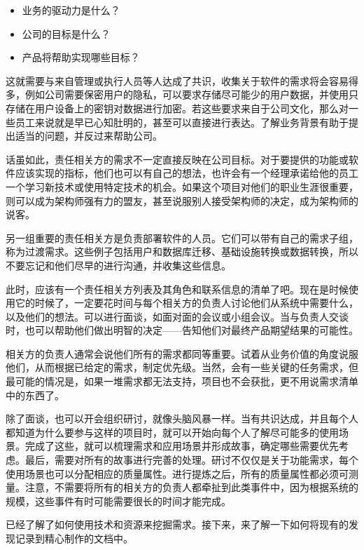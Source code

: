 \begin{itemize}
\item 
业务的驱动力是什么？

\item 
公司的目标是什么？

\item 
产品将帮助实现哪些目标？
\end{itemize}

这就需要与来自管理或执行人员等人达成了共识，收集关于软件的需求将会容易得多，例如公司需要保密用户的隐私，可以要求存储尽可能少的用户数据，并使用只存储在用户设备上的密钥对数据进行加密。若这些要求来自于公司文化，那么对一些员工来说就是早已心知肚明的，甚至可以直接进行表达。了解业务背景有助于提出适当的问题，并反过来帮助公司。

话虽如此，责任相关方的需求不一定直接反映在公司目标。对于要提供的功能或软件应该实现的指标，他们也可以有自己的想法，也许会有一个经理承诺给他的员工一个学习新技术或使用特定技术的机会。如果这个项目对他们的职业生涯很重要，则可以成为架构师强有力的盟友，甚至说服别人接受架构师的决定，成为架构师的说客。

另一组重要的责任相关方是负责部署软件的人员。它们可以带有自己的需求子组，称为过渡需求。这些例子包括用户和数据库迁移、基础设施转换或数据转换，所以不要忘记和他们尽早的进行沟通，并收集这些信息。


此时，应该有一个责任相关方列表及其角色和联系信息的清单了吧。现在是时候使用它的时候了，一定要花时间与每个相关方的负责人讨论他们从系统中需要什么，以及他们的想法。可以进行面谈，如面对面的会议或小组会议。当与负责人交谈时，也可以帮助他们做出明智的决定——告知他们对最终产品期望结果的可能性。

相关方的负责人通常会说他们所有的需求都同等重要。试着从业务价值的角度说服他们，从而根据已给定的需求，制定优先级。当然，会有一些关键的任务需求，但最可能的情况是，如果一堆需求都无法支持，项目也不会获批，更不用说需求清单中的东西了。

除了面谈，也可以开会组织研讨，就像头脑风暴一样。当有共识达成，并且每个人都知道为什么要参与这样的项目时，就可以开始向每个人了解尽可能多的使用场景。完成了这些，就可以梳理需求和应用场景并形成故事，确定哪些需要优先考虑。最后，需要对所有的故事进行完善的处理。研讨不仅仅是关于功能需求，每个使用场景也可以分配相应的质量属性。进行提炼之后，所有的质量属性都必须可测量。注意，不需要将所有的相关方的负责人都牵扯到此类事件中，因为根据系统的规模，这些事件有时可能需要很长的时间才能完成。

已经了解了如何使用技术和资源来挖掘需求。接下来，来了解一下如何将现有的发现记录到精心制作的文档中。







